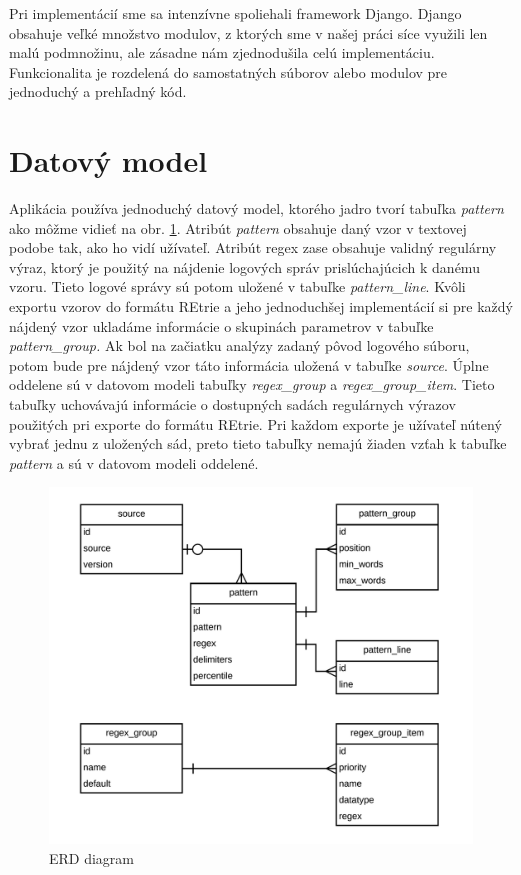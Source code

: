  
Pri implementácií sme sa intenzívne spoliehali framework Django. Django obsahuje veľké množstvo modulov, z ktorých sme v našej práci síce využili len malú podmnožinu, ale zásadne nám zjednodušila celú implementáciu. Funkcionalita je rozdelená do samostatných súborov alebo modulov pre jednoduchý a prehľadný kód.

\section{Datový model}
Aplikácia používa jednoduchý datový model, ktorého jadro tvorí tabuľka \emph{pattern} ako môžme vidieť na obr. \ref{fig:erd}. Atribút \emph{pattern} obsahuje daný vzor v textovej podobe tak, ako ho vidí užívateľ. Atribút regex zase obsahuje validný regulárny výraz, ktorý je použitý na nájdenie logových správ prislúchajúcich k danému vzoru. Tieto logové správy sú potom uložené v tabuľke \emph{pattern\_line}. Kvôli exportu vzorov do formátu REtrie a jeho jednoduchšej implementácií si pre každý nájdený vzor ukladáme informácie o skupinách parametrov v tabuľke \emph{pattern\_group.} Ak bol na začiatku analýzy zadaný pôvod logového súboru, potom bude pre nájdený vzor táto informácia uložená v tabuľke \emph{source}. Úplne oddelene sú v datovom modeli tabuľky \emph{regex\_group} a \emph{regex\_group\_item}. Tieto tabuľky uchovávajú informácie o dostupných sadách regulárnych výrazov použitých pri exporte do formátu REtrie. Pri každom exporte je užívateľ nútený vybrať jednu z uložených sád, preto tieto tabuľky nemajú žiaden vzťah k tabuľke \emph{pattern} a sú v datovom modeli oddelené.

\begin{figure}[htbp]
 \centering 
 \begin{minipage}{0.95\linewidth}
 	\centering
 	\includegraphics[width=\textwidth]{Images/thesis-erd.png}	
 \end{minipage}
  \caption{ERD diagram}
  \label{fig:erd}
\end{figure}

